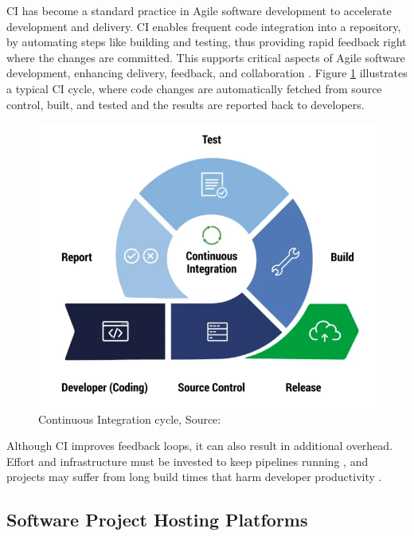 \acf{CI} has become a standard practice in Agile software development to accelerate development and delivery. CI enables frequent code integration into a repository, by automating steps like building and testing, thus providing rapid feedback right where the changes are committed. This supports critical aspects of Agile software development, enhancing delivery, feedback, and collaboration \cite{ugwuezeContinuousIntegrationDeployment2024}. Figure \ref{fig:ci-cycle} illustrates a typical CI cycle, where code changes are automatically fetched from source control, built, and tested and the results are reported back to developers.

\begin{figure}[H]
    \centering
    \includegraphics[width=1\textwidth]{images/ci-cycle.png}
    \caption{Continuous Integration cycle, Source:~\cite{lovettTop12Benefits2023}}
    \label{fig:ci-cycle}
\end{figure}

Although \ac{CI} improves feedback loops, it can also result in additional overhead. Effort and infrastructure must be invested to keep pipelines running \cite{hiltonUsageCostsBenefits2016}, and projects may suffer from long build times that harm developer productivity \cite{ghalebEmpiricalStudyLong2019}.

\subsection{Software Project Hosting Platforms} \label{subsection:Software Project Hosting Platforms}


